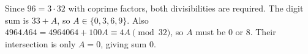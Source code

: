 Since $96=3\cdot32$ with coprime factors, both divisibilities are required. The digit sum is $33+A$, so $A\in\{0,3,6,9\}$. Also $4964A64=4964064+100A\equiv4A\pmod{32}$, so $A$ must be $0$ or $8$. Their intersection is only $A=0$, giving sum $\boxed0$.
